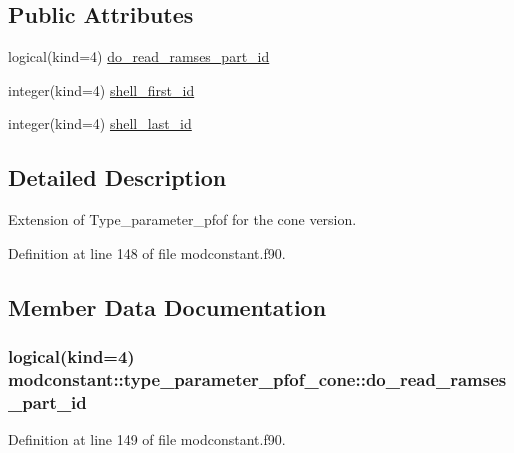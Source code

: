 \subsection*{Public Attributes}
\begin{DoxyCompactItemize}
\item 
logical(kind=4) \hyperlink{structmodconstant_1_1type__parameter__pfof__cone_a72b740a2e3a315cd2df95034048327fa}{do\-\_\-read\-\_\-ramses\-\_\-part\-\_\-id}
\item 
integer(kind=4) \hyperlink{structmodconstant_1_1type__parameter__pfof__cone_a51f2b74874730f91a44f714d515fb423}{shell\-\_\-first\-\_\-id}
\item 
integer(kind=4) \hyperlink{structmodconstant_1_1type__parameter__pfof__cone_a50cff304d33c3b950d4e9f2cb3ffb70d}{shell\-\_\-last\-\_\-id}
\end{DoxyCompactItemize}


\subsection{Detailed Description}
Extension of Type\-\_\-parameter\-\_\-pfof for the cone version. 

Definition at line 148 of file modconstant.\-f90.



\subsection{Member Data Documentation}
\hypertarget{structmodconstant_1_1type__parameter__pfof__cone_a72b740a2e3a315cd2df95034048327fa}{
\subsubsection[{do\-\_\-read\-\_\-ramses\-\_\-part\-\_\-id}]{\setlength{\rightskip}{0pt plus 5cm}logical(kind=4) modconstant\-::type\-\_\-parameter\-\_\-pfof\-\_\-cone\-::do\-\_\-read\-\_\-ramses\-\_\-part\-\_\-id}}\label{structmodconstant_1_1type__parameter__pfof__cone_a72b740a2e3a315cd2df95034048327fa}


Definition at line 149 of file modconstant.\-f90.

